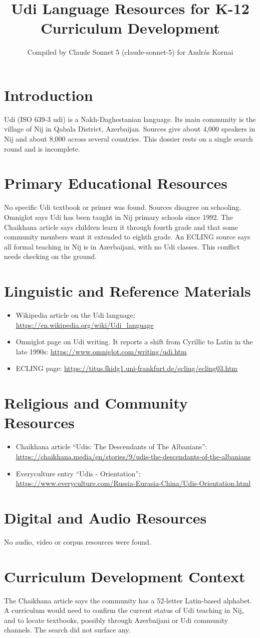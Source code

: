 \documentclass[12pt]{article}
\title{Udi Language Resources for K-12 Curriculum Development}
\author{Compiled by Claude Sonnet 5 (claude-sonnet-5) for Andr\'as Kornai}
\date{}
\begin{document}
\maketitle
\section{Introduction}
Udi (ISO 639-3 udi) is a Nakh-Daghestanian language. Its main community is the village of Nij in Qabala District, Azerbaijan. Sources give about 4,000 speakers in Nij and about 8,000 across several countries. This dossier rests on a single search round and is incomplete.
\section{Primary Educational Resources}
No specific Udi textbook or primer was found. Sources disagree on schooling. Omniglot says Udi has been taught in Nij primary schools since 1992. The Chaikhana article says children learn it through fourth grade and that some community members want it extended to eighth grade. An ECLING source says all formal teaching in Nij is in Azerbaijani, with no Udi classes. This conflict needs checking on the ground.
\section{Linguistic and Reference Materials}
\begin{itemize}
\item Wikipedia article on the Udi language: \url{https://en.wikipedia.org/wiki/Udi_language}
\item Omniglot page on Udi writing. It reports a shift from Cyrillic to Latin in the late 1990s: \url{https://www.omniglot.com/writing/udi.htm}
\item ECLING page: \url{https://titus.fkidg1.uni-frankfurt.de/ecling/ecling03.htm}
\end{itemize}
\section{Religious and Community Resources}
\begin{itemize}
\item Chaikhana article ``Udis: The Descendants of The Albanians'': \url{https://chaikhana.media/en/stories/9/udis-the-descendants-of-the-albanians}
\item Everyculture entry ``Udis - Orientation'': \url{https://www.everyculture.com/Russia-Eurasia-China/Udis-Orientation.html}
\end{itemize}
\section{Digital and Audio Resources}
No audio, video or corpus resources were found.
\section{Curriculum Development Context}
The Chaikhana article says the community has a 52-letter Latin-based alphabet. A curriculum would need to confirm the current status of Udi teaching in Nij, and to locate textbooks, possibly through Azerbaijani or Udi community channels. The search did not surface any.
\end{document}
